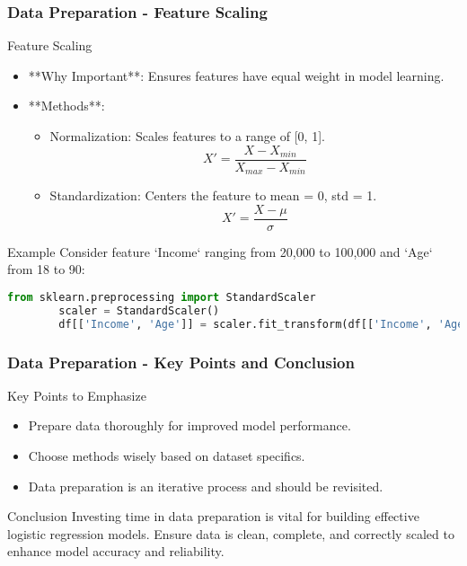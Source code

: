 \documentclass[aspectratio=169]{beamer}
\begin{document}
\begin{frame}[fragile]
    \frametitle{Data Preparation - Feature Scaling}
    \begin{block}{Feature Scaling}
        \begin{itemize}
            \item **Why Important**: Ensures features have equal weight in model learning.
            \item **Methods**:
            \begin{itemize}
                \item Normalization: Scales features to a range of [0, 1].
                \begin{equation}
                X' = \frac{X - X_{min}}{X_{max} - X_{min}}
                \end{equation}
                \item Standardization: Centers the feature to mean = 0, std = 1.
                \begin{equation}
                X' = \frac{X - \mu}{\sigma}
                \end{equation}
            \end{itemize}
        \end{itemize}
    \end{block}
    \begin{block}{Example}
        Consider feature `Income` ranging from 20,000 to 100,000 and `Age` from 18 to 90:
        \begin{lstlisting}[language=Python]
        from sklearn.preprocessing import StandardScaler
        scaler = StandardScaler()
        df[['Income', 'Age']] = scaler.fit_transform(df[['Income', 'Age']])
        \end{lstlisting}
    \end{block}
\end{frame}

\begin{frame}[fragile]
    \frametitle{Data Preparation - Key Points and Conclusion}
    \begin{block}{Key Points to Emphasize}
        \begin{itemize}
            \item Prepare data thoroughly for improved model performance.
            \item Choose methods wisely based on dataset specifics.
            \item Data preparation is an iterative process and should be revisited.
        \end{itemize}
    \end{block}
    \begin{block}{Conclusion}
        Investing time in data preparation is vital for building effective logistic regression models. Ensure data is clean, complete, and correctly scaled to enhance model accuracy and reliability.
    \end{block}
\end{frame}
\end{document}

